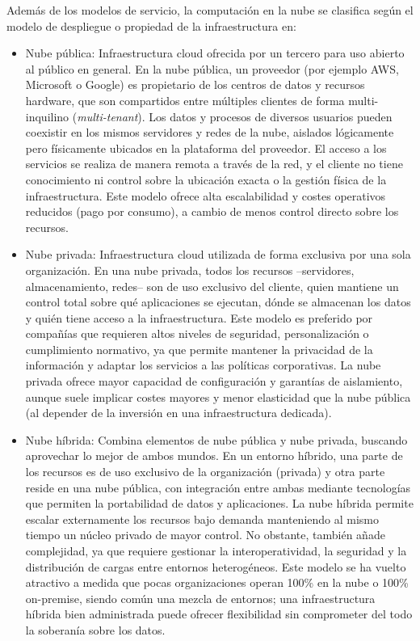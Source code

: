 \documentclass[12pt,twoside,titlepage]{report}
\begin{document}
Además de los modelos de servicio, la computación en la nube se clasifica según el modelo de despliegue o propiedad de la infraestructura en:
\begin{itemize}
    \item Nube pública: Infraestructura cloud ofrecida por un tercero para uso abierto al público en general. En la nube pública, un proveedor (por ejemplo AWS, Microsoft o Google) es propietario de los centros de datos y recursos hardware, que son compartidos entre múltiples clientes de forma multi-inquilino (\textit{multi-tenant}). Los datos y procesos de diversos usuarios pueden coexistir en los mismos servidores y redes de la nube, aislados lógicamente pero físicamente ubicados en la plataforma del proveedor. El acceso a los servicios se realiza de manera remota a través de la red, y el cliente no tiene conocimiento ni control sobre la ubicación exacta o la gestión física de la infraestructura. Este modelo ofrece alta escalabilidad y costes operativos reducidos (pago por consumo), a cambio de menos control directo sobre los recursos.
    \item Nube privada: Infraestructura cloud utilizada de forma exclusiva por una sola organización. En una nube privada, todos los recursos –servidores, almacenamiento, redes– son de uso exclusivo del cliente, quien mantiene un control total sobre qué aplicaciones se ejecutan, dónde se almacenan los datos y quién tiene acceso a la infraestructura. Este modelo es preferido por compañías que requieren altos niveles de seguridad, personalización o cumplimiento normativo, ya que permite mantener la privacidad de la información y adaptar los servicios a las políticas corporativas. La nube privada ofrece mayor capacidad de configuración y garantías de aislamiento, aunque suele implicar costes mayores y menor elasticidad que la nube pública (al depender de la inversión en una infraestructura dedicada).
    \item Nube híbrida: Combina elementos de nube pública y nube privada, buscando aprovechar lo mejor de ambos mundos. En un entorno híbrido, una parte de los recursos es de uso exclusivo de la organización (privada) y otra parte reside en una nube pública, con integración entre ambas mediante tecnologías que permiten la portabilidad de datos y aplicaciones. La nube híbrida permite escalar externamente los recursos bajo demanda manteniendo al mismo tiempo un núcleo privado de mayor control. No obstante, también añade complejidad, ya que requiere gestionar la interoperatividad, la seguridad y la distribución de cargas entre entornos heterogéneos. Este modelo se ha vuelto atractivo a medida que pocas organizaciones operan 100\% en la nube o 100\% on-premise, siendo común una mezcla de entornos; una infraestructura híbrida bien administrada puede ofrecer flexibilidad sin comprometer del todo la soberanía sobre los datos.
\end{itemize}
\end{document}
